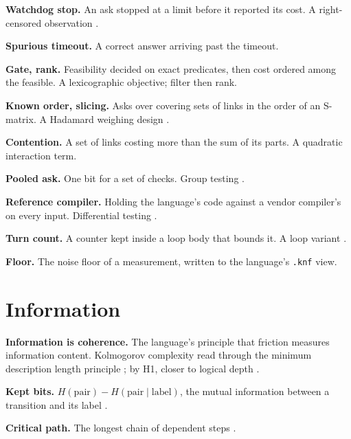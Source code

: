 \noindent\textbf{Watchdog stop.} An ask stopped at a limit before it reported its cost. A
right-censored observation \cite{src:Kaplan-Meier}.

\noindent\textbf{Spurious timeout.} A correct answer arriving past the timeout.

\noindent\textbf{Gate, rank.} Feasibility decided on exact predicates, then cost ordered among the
feasible. A lexicographic objective; filter then rank.

\noindent\textbf{Known order, slicing.} Asks over covering sets of links in the order of an
S-matrix. A Hadamard weighing design \cite{src:Hotelling, src:Sloane-Harwit}.

\noindent\textbf{Contention.} A set of links costing more than the sum of its parts. A quadratic
interaction term.

\noindent\textbf{Pooled ask.} One bit for a set of checks. Group testing
\cite{src:Dorfman, src:Ungar}.

\noindent\textbf{Reference compiler.} Holding the language's code against a vendor compiler's on
every input. Differential testing \cite{src:McKeeman}.

\noindent\textbf{Turn count.} A counter kept inside a loop body that bounds it. A loop variant
\cite{src:Floyd}.

\noindent\textbf{Floor.} The noise floor of a measurement, written to the language's
\texttt{.knf} view.

\section{Information}

\noindent\textbf{Information is coherence.} The language's principle that friction measures
information content. Kolmogorov complexity \cite{src:Kolmogorov} read through the minimum
description length principle \cite{src:Rissanen}; by H1, closer to logical depth
\cite{src:Bennett}.

\noindent\textbf{Kept bits.} \(H(\text{pair}) - H(\text{pair}\mid\text{label})\), the mutual
information between a transition and its label \cite{src:Shannon}.

\noindent\textbf{Critical path.} The longest chain of dependent steps \cite{src:Kelley-Walker}.
